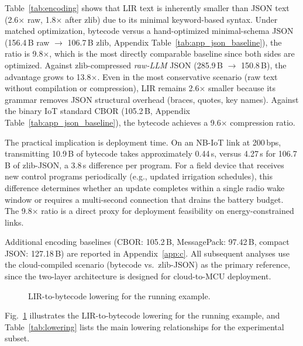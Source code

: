 \documentclass[a4paper,fleqn,longmktitle]{cas-dc}
\begin{document}
Table~\ref{tab:encoding} shows that LIR text is inherently smaller than JSON text (2.6$\times$ raw, 1.8$\times$ after zlib) due to its minimal keyword-based syntax. Under matched optimization, bytecode versus a hand-optimized minimal-schema JSON (156.4\,B raw $\to$ 106.7\,B zlib, Appendix Table~\ref{tab:app_json_baseline}), the ratio is 9.8$\times$, which is the most directly comparable baseline since both sides are optimized. Against zlib-compressed \emph{raw-LLM} JSON (285.9\,B $\to$ 150.8\,B), the advantage grows to 13.8$\times$. Even in the most conservative scenario (raw text without compilation or compression), LIR remains 2.6$\times$ smaller because its grammar removes JSON structural overhead (braces, quotes, key names). Against the binary IoT standard CBOR (105.2\,B, Appendix Table~\ref{tab:app_json_baseline}), the bytecode achieves a 9.6$\times$ compression ratio.

The practical implication is deployment time. On an NB-IoT link at 200\,bps, transmitting 10.9\,B of bytecode takes approximately 0.44\,s, versus 4.27\,s for 106.7\,B of zlib-JSON, a 3.8\,s difference per program. For a field device that receives new control programs periodically (e.g., updated irrigation schedules), this difference determines whether an update completes within a single radio wake window or requires a multi-second connection that drains the battery budget. The 9.8$\times$ ratio is a direct proxy for deployment feasibility on energy-constrained links.

Additional encoding baselines (CBOR: 105.2\,B, MessagePack: 97.42\,B, compact JSON: 127.18\,B) are reported in Appendix~\ref{app:c}. All subsequent analyses use the cloud-compiled scenario (bytecode vs.\ zlib-JSON) as the primary reference, since the two-layer architecture is designed for cloud-to-MCU deployment.

\begin{figure}[!tbp]
  \centering
  
  \caption{LIR-to-bytecode lowering for the running example.}
  \label{fig:lowering}
\end{figure}

Fig.~\ref{fig:lowering} illustrates the LIR-to-bytecode lowering for the running example, and Table~\ref{tab:lowering} lists the main lowering relationships for the experimental subset.
\end{document}
